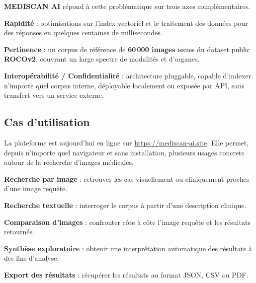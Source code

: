 \documentclass[12pt,a4paper]{article}
\begin{document}
\vspace{0.3cm}
\textbf{MEDISCAN AI} répond à cette problématique sur trois axes complémentaires.

\vspace{0.3cm}

\begin{sq}
  \item \textbf{Rapidité} : optimisations sur l'index vectoriel et le traitement des données pour des réponses en quelques centaines de millisecondes.
  \item \textbf{Pertinence} : un corpus de référence de \textbf{60\,000 images} issues du dataset public \textbf{ROCOv2}, couvrant un large spectre de modalités et d'organes.
  \item \textbf{Interopérabilité / Confidentialité} : architecture pluggable, capable d'indexer n'importe quel corpus interne, déployable localement ou exposée par API, sans transfert vers un service externe.
\end{sq}

\vspace{0.7cm}

\subsection{Cas d'utilisation}

\vspace{0.2cm}
La plateforme est aujourd'hui en ligne sur \url{https://mediscan-ai.site}.
Elle permet, depuis n'importe quel navigateur et sans installation,
plusieurs usages concrets autour de la recherche d'images médicales.

\vspace{0.3cm}

\begin{sq}
  \item \textbf{Recherche par image} : retrouver les cas visuellement ou cliniquement proches d'une image requête.
  \item \textbf{Recherche textuelle} : interroger le corpus à partir d'une description clinique.
  \item \textbf{Comparaison d'images} : confronter côte à côte l'image requête et les résultats retournés.
  \item \textbf{Synthèse exploratoire} : obtenir une interprétation automatique des résultats à des fins d'analyse.
  \item \textbf{Export des résultats} : récupérer les résultats au format JSON, CSV ou PDF.
\end{sq}
\end{document}
